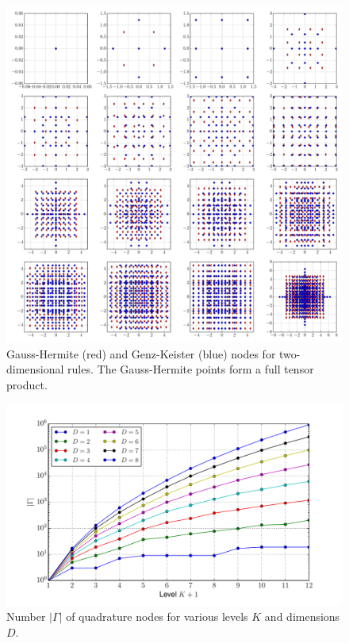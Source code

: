 \documentclass[a4paper,10pt]{article}
\begin{document}
\begin{figure}[h]
  \centering
  \includegraphics[width=\linewidth]{./img/gk_hermitephy_nodes_2d.pdf}
  \caption{Gauss-Hermite (red) and Genz-Keister (blue) nodes for
  two-dimensional rules. The Gauss-Hermite points form a full tensor
  product.}
  \label{fig:gk_hermitephy_nodes_2d}
\end{figure}

\begin{figure}
  \centering
  \includegraphics[width=\linewidth]{./img/number_nodes_levdim_hermitephy.pdf}
  \caption{Number $|\Gamma|$ of quadrature nodes for various levels $K$ and dimensions $D$.}
  \label{fig:number_nodes_levdim_hermitephy}
\end{figure}
\end{document}

